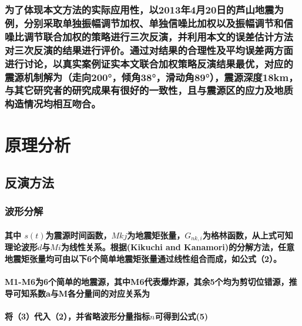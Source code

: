 \documentclass[a4paper,12pt,single,pdftex]{scrartcl}
\begin{document}
\label{ID_1381199343}\subsubsection{为了体现本文方法的实际应用性，以2013年4月20日的芦山地震为例，分别采取单独振幅调节加权、单独信噪比加权以及振幅调节和信噪比调节联合加权的策略进行三次反演，并利用本文的误差估计方法对三次反演的结果进行评价。通过对结果的合理性及平均误差两方面进行讨论，以真实案例证实本文联合加权策略反演结果最优，对应的震源机制解为（走向200°，倾角38°，滑动角89°），震源深度18km，与其它研究者的研究成果有很好的一致性，且与震源区的应力及地质构造情况均相互吻合。}

\label{ID_64212303}\section{原理分析}

\label{ID_1219588045}\subsection{反演方法}

\label{ID_1243921566}\subsubsection{波形分解}

\label{ID_1903486780}\paragraph{}

\label{ID_1523655541}\paragraph{其中 $s(t)$为震源时间函数，$Mkj$为地震矩张量，$G_{nk,i}$为格林函数，从上式可知理论波形$d$与$Mi$为线性关系。根据(Kikuchi and Kanamori)的分解方法，任意地震矩张量均可由以下6个简单地震矩张量通过线性组合而成，如公式（2）。}

\label{ID_1895578740}\paragraph{M1-M6为6个简单的地震源，其中M6代表爆炸源，其余5个均为剪切位错源，推导可知系数a与M各分量间的对应关系为}

\label{ID_733899755}\paragraph{将（3）代入（2），并省略波形分量指标$n$可得到公式(5)}
\end{document}
